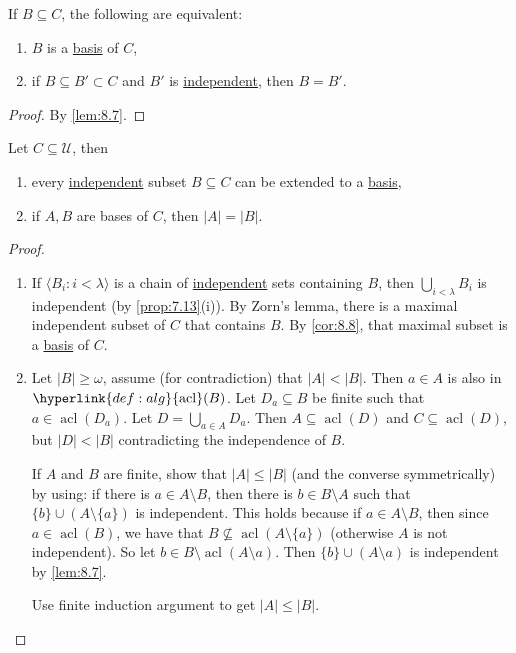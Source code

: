 \documentclass{article}
\DeclareMathOperator{\acl}{acl}
\newcommand{\named}[1]{\textbf{#1}\index{#1}}
\newcommand{\U}{\mathcal{U}}
\begin{document}
\begin{ncor}\label{cor:8.8}
  If $B \subseteq C$, the following are equivalent:
  \begin{enumerate}[label=(\roman*)]
    \item $B$ is a \hyperlink{def:basis}{basis} of $C$,
    \item if $B \subseteq B' \subset C$ and $B'$ is \hyperlink{def:indep}{independent}, then $B = B'$.
  \end{enumerate}
\end{ncor}
\begin{proof}
  By \cref{lem:8.7}.
\end{proof}
\begin{nthm}\label{thm:8.9}
  Let $C \subseteq \U$, then
  \begin{enumerate}[label=(\roman*)]
    \item every \hyperlink{def:indep}{independent} subset $B \subseteq C$ can be extended to a \hyperlink{def:basis}{basis},
    \item if $A,B$ are bases of $C$, then $|A| = |B|$.
  \end{enumerate}
\end{nthm}
\begin{proof}\leavevmode
  \begin{enumerate}[label=(\roman*)]
    \item If $\langle B_i : i < \lambda \rangle$ is a chain of \hyperlink{def:indep}{independent} sets containing $B$, then $\bigcup_{i < \lambda} B_i$ is independent (by \cref{prop:7.13}(i)).
      By Zorn's lemma, there is a maximal independent subset of $C$ that contains $B$. By \cref{cor:8.8}, that maximal subset is a \hyperlink{def:basis}{basis} of $C$.
    \item {}Let $|B| \geq \omega$, assume (for contradiction) that $|A| < |B|$.
      Then $a \in A$ is also in $\hyperlink{def:alg}{\acl}(B)$.
      Let $D_a \subseteq B$ be finite such that $a \in \acl(D_a)$. Let $D = \bigcup_{a \in A} D_a$.
      Then $A \subseteq \acl(D)$ and $C \subseteq \acl(D)$, but $|D| < |B|$ contradicting the independence of $B$.

      If $A$ and $B$ are finite, show that $|A| \leq |B|$  (and the converse symmetrically) by using: if there is $a \in A \setminus B$, then there is $b \in B \setminus A$ such that $\{b\} \cup \left( A \setminus \{a\} \right)$ is independent.
      This holds because if $a \in A \setminus B$, then since $a \in \acl(B)$, we have that $B \nsubseteq \acl(A \setminus \{a\})$ (otherwise $A$ is not independent).
      So let $b \in B \setminus \acl(A \setminus a)$.
      Then $\{b\} \cup (A \setminus a)$ is independent by \cref{lem:8.7}.

      Use finite induction argument to get $|A| \leq |B|$. \qedhere
  \end{enumerate}
\end{proof}
\end{document}

